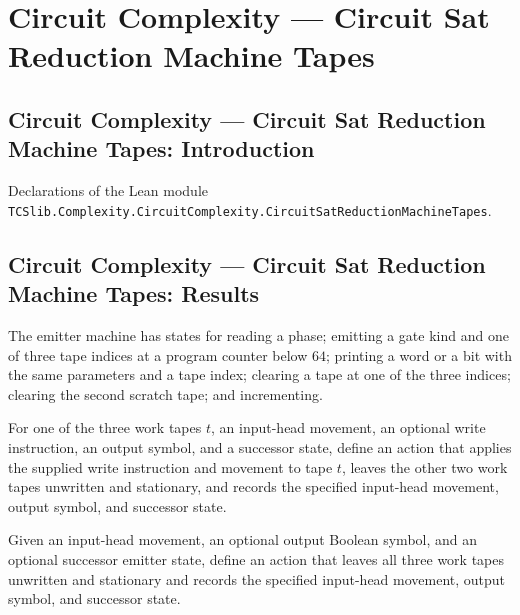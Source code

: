 \section{Circuit Complexity --- Circuit Sat Reduction Machine Tapes}
\subsection*{Circuit Complexity --- Circuit Sat Reduction Machine Tapes: Introduction}

Declarations of the Lean module \texttt{TCSlib.Complexity.CircuitComplexity.CircuitSatReductionMachineTapes}.

\subsection*{Circuit Complexity --- Circuit Sat Reduction Machine Tapes: Results}

\begin{definition}
\label{BoolCircuit.CktSatReduction.Emitter.St}
\leanok
{}
The emitter machine has states for reading a phase; emitting a gate kind and one of
three tape indices at a program counter below $64$; printing a word or a bit with the
same parameters and a tape index; clearing a tape at one of the three indices; clearing
the second scratch tape; and incrementing.
\end{definition}

\begin{definition}
\label{BoolCircuit.CktSatReduction.Emitter.act}
\leanok
{}
For one of the three work tapes $t$, an input-head movement, an optional write
instruction, an output symbol, and a successor state, define an action that applies the
supplied write instruction and movement to tape $t$, leaves the other two work tapes
unwritten and stationary, and records the specified input-head movement, output symbol,
and successor state.
\end{definition}

\begin{definition}
\label{BoolCircuit.CktSatReduction.Emitter.ctl}
\leanok
{}
Given an input-head movement, an optional output Boolean symbol, and an optional
successor emitter state, define an action that leaves all three work tapes unwritten and
stationary and records the specified input-head movement, output symbol, and successor
state.
\end{definition}


